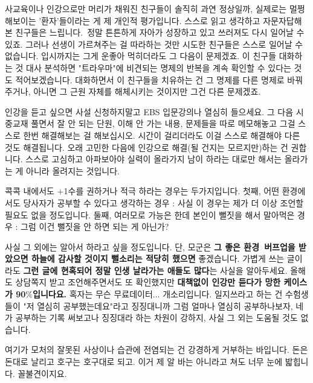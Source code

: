 사교육이나 인강으로만 머리가 채워진 친구들이 솔직히 과연 정상일까, 실제로는 멀쩡해보이는 '환자'들이라는 게 제 개인적 평가입니다.
스스로 읽고 생각하고 자문자답해본 친구들은 느립니다. 정말 튼튼하게 자아가 성장하고 있고 쓰러져도 다시 일어날 수 있죠.
그러나 선생이 가르쳐주는 걸 따라하는 것만 시도한 친구들은 스스로 일어날 수 없습니다. 입시까지는 그게 운좋아 먹히더라도 그 다음이 문제겠죠.
이 친구들 대화하는 것 대사 분석하면 "트라우마"에 비견되는 명제의 반복을 계속 확인할 수 있다는 것도 적어보겠습니다.
대화하면서 이 친구들을 치유하는 건 그 명제를 다른 명제로 바꿔주거나, 아니면 그 근원 자체를 해체시키는 것이지만 그건 다른 문제겠죠.
\vspace{5mm}

인강을 듣고 싶으면 사설 신청하지말고 EBS 입문강의나 열심히 들으세요.
그 다음 시중교재 풀면서 잘 안 되는 단원, 이해 안 가는 내용, 문제들을 따로 메모해놓고
그걸 스스로 한번 해결해보는 걸 해보십시오. 시간이 걸리더라도 이걸 스스로 해결해야 다른 것도 해결됩니다.
오래 고민한 다음에 인강으로 해결(될 건지는 모르지만)하는 건 권합니다. 스스로 고심하고 아파보아야 실력이 올라가지
남이 하라는 대로만 해서는 올라가는 게 아니라 올려지는 것입니다.
\vspace{5mm}

콕콕 내에서도 +1수를 권하거나 적극 하라는 경우는 두가지입니다.
첫째, 어떤 환경에서도 당사자가 공부할 수 있다고 생각하는 경우 : 사실 이 경우는 제가 더 이상 조언할 필요도 없을 정도입니다.
둘째, 여러모로 가능은 한데 본인이 뻘짓을 해서 말아먹은 경우 : 그럼 이건 뻘짓을 안 하면 되는 게 아닌가?
\vspace{5mm}

사실 그 외에는 알아서 하라고 싶을 정도입니다.
단, 모군은 \textbf{그 좋은 환경 버프업을 받았으면 하늘에 감사할 것이지 뻘소리는 적당히 했으면} 좋겠습니다.
가볍게 쓰는 글이라도 \textbf{그런 글에 현혹되어 정말 인생 날라가는 애들도 많다}는 사실을 알아두세요.
올해도 상담쪽지 받고 조언해주면서도 또 확인했지만 \textbf{대책없이 인강만 듣다가 망한 케이스가 90$\%$입니다요.}
혹자는 무슨 무료데이터... 개소리입니다. 일지쓰라고 하는 건 수험생들이 "저 열심히 공부했는데요"라고 징징대니까
그럼 얼마나 열심히 공부하나보자, 네가 공부하는 기록 써보고나 징징대라 하는 차원이 강하지, 사실 그 외는 도움될 것도 없습니다.
\vspace{5mm}

여기가 모처의 잘못된 사상이나 습관에 전염되는 건 강경하게 거부하는 바입니다.
돈은 돈대로 날리고 호구는 호구대로 되고. 이거 제 알 바는 아니라고 쳐도 너무 눈에 밟힙니다. 꼴불견이지요.
\vspace{5mm}

